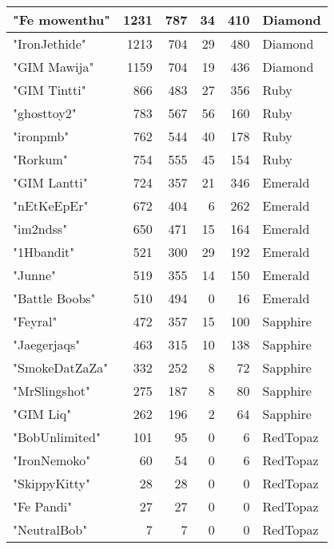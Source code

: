 \documentclass{article}
\begin{document}
\begin{table}[htbp]
\begin{tabular}{|l|r|r|r|r|l|}
"Fe mowenthu" & 1231 & 787 & 34 & 410 & Diamond \\ \hline
"IronJethide" & 1213 & 704 & 29 & 480 & Diamond \\ \hline
"GIM Mawija" & 1159 & 704 & 19 & 436 & Diamond \\ \hline
"GIM Tintti" & 866 & 483 & 27 & 356 & Ruby \\ \hline
"ghosttoy2" & 783 & 567 & 56 & 160 & Ruby \\ \hline
"ironpmb" & 762 & 544 & 40 & 178 & Ruby \\ \hline
"Rorkum" & 754 & 555 & 45 & 154 & Ruby \\ \hline
"GIM Lantti" & 724 & 357 & 21 & 346 & Emerald \\ \hline
"nEtKeEpEr" & 672 & 404 & 6 & 262 & Emerald \\ \hline
"im2ndss" & 650 & 471 & 15 & 164 & Emerald \\ \hline
"1Hbandit" & 521 & 300 & 29 & 192 & Emerald \\ \hline
"Junne" & 519 & 355 & 14 & 150 & Emerald \\ \hline
"Battle Boobs" & 510 & 494 & 0 & 16 & Emerald \\ \hline
"Feyral" & 472 & 357 & 15 & 100 & Sapphire \\ \hline
"Jaegerjaqs" & 463 & 315 & 10 & 138 & Sapphire \\ \hline
"SmokeDatZaZa" & 332 & 252 & 8 & 72 & Sapphire \\ \hline
"MrSlingshot" & 275 & 187 & 8 & 80 & Sapphire \\ \hline
"GIM Liq" & 262 & 196 & 2 & 64 & Sapphire \\ \hline
"BobUnlimited" & 101 & 95 & 0 & 6 & RedTopaz \\ \hline
"IronNemoko" & 60 & 54 & 0 & 6 & RedTopaz \\ \hline
"SkippyKitty" & 28 & 28 & 0 & 0 & RedTopaz \\ \hline
"Fe Pandi" & 27 & 27 & 0 & 0 & RedTopaz \\ \hline
"NeutralBob" & 7 & 7 & 0 & 0 & RedTopaz \\ \hline
\end{tabular}
\end{table}
\end{document}

